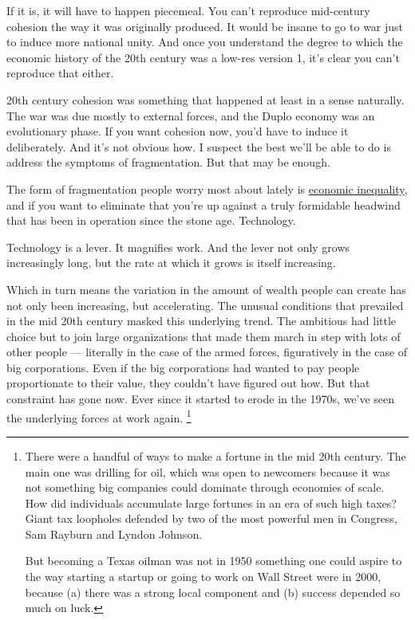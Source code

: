 \documentclass[12pt]{book}
\begin{document}
If it is, it will have to happen piecemeal. You can't reproduce
mid-century cohesion the way it was originally produced. It would be
insane to go to war just to induce more national unity. And once you
understand the degree to which the economic history of the 20th century
was a low-res version 1, it's clear you can't reproduce that either.

20th century cohesion was something that happened at least in a sense
naturally. The war was due mostly to external forces, and the Duplo
economy was an evolutionary phase. If you want cohesion now, you'd have
to induce it deliberately. And it's not obvious how. I suspect the best
we'll be able to do is address the symptoms of fragmentation. But that
may be enough.

The form of fragmentation people worry most about lately is
\href{ineq.html}{economic inequality}, and if you want to eliminate that
you're up against a truly formidable headwind that has been in operation
since the stone age. Technology.

Technology is a lever. It magnifies work. And the lever not only grows
increasingly long, but the rate at which it grows is itself increasing.

Which in turn means the variation in the amount of wealth people can
create has not only been increasing, but accelerating. The unusual
conditions that prevailed in the mid 20th century masked this underlying
trend. The ambitious had little choice but to join large organizations
that made them march in step with lots of other people --- literally in
the case of the armed forces, figuratively in the case of big
corporations. Even if the big corporations had wanted to pay people
proportionate to their value, they couldn't have figured out how. But
that constraint has gone now. Ever since it started to erode in the
1970s, we've seen the underlying forces at work again.
\footnote{There were a handful of ways to make a fortune in the mid 20th
century. The main one was drilling for oil, which was open to newcomers
because it was not something big companies could dominate through
economies of scale. How did individuals accumulate large fortunes in an
era of such high taxes? Giant tax loopholes defended by two of the most
powerful men in Congress, Sam Rayburn and Lyndon Johnson.

But becoming a Texas oilman was not in 1950 something one could aspire
to the way starting a startup or going to work on Wall Street were in
2000, because (a) there was a strong local component and (b) success
depended so much on luck.}
\end{document}
